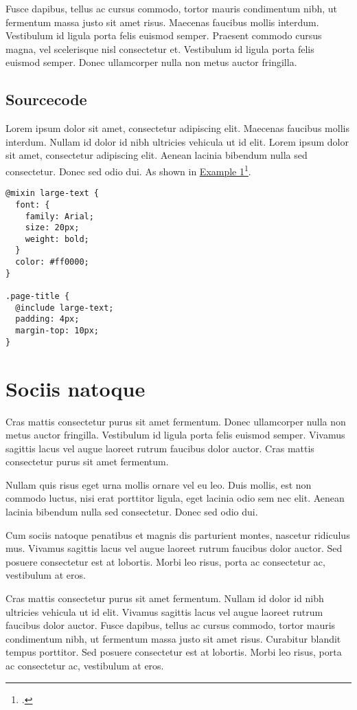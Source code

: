 \documentclass[a4paper]{article}
\begin{document}
\begin{multicols}{2}
Fusce dapibus, tellus ac cursus commodo, tortor mauris condimentum nibh, ut 
fermentum massa justo sit amet risus. Maecenas faucibus mollis interdum. 
Vestibulum id ligula porta felis euismod semper. Praesent commodo cursus magna, 
vel scelerisque nisl consectetur et. Vestibulum id ligula porta felis euismod 
semper. Donec ullamcorper nulla non metus auctor fringilla.

\subsection{Sourcecode}
Lorem ipsum dolor sit amet, consectetur adipiscing elit. Maecenas faucibus 
mollis interdum. Nullam id dolor id nibh ultricies vehicula ut id elit. Lorem 
ipsum dolor sit amet, consectetur adipiscing elit. Aenean lacinia bibendum nulla 
sed consectetur. Donec sed odio dui. As shown in 
\hyperref[mixin]{Example 1}\footcite[Taken from: ][]{sass:mixins}.

\begin{lstlisting}[caption={Example 1\label{mixin}}]
@mixin large-text {
  font: {
    family: Arial;
    size: 20px;
    weight: bold;
  }
  color: #ff0000;
}

.page-title {
  @include large-text;
  padding: 4px;
  margin-top: 10px;
}
\end{lstlisting}

\section{Sociis natoque}
Cras mattis consectetur purus sit amet fermentum. Donec ullamcorper nulla non 
metus auctor fringilla. Vestibulum id ligula porta felis euismod semper. Vivamus 
sagittis lacus vel augue laoreet rutrum faucibus dolor auctor. Cras mattis 
consectetur purus sit amet fermentum.

Nullam quis risus eget urna mollis ornare vel eu leo. Duis mollis, est non 
commodo luctus, nisi erat porttitor ligula, eget lacinia odio sem nec elit. 
Aenean lacinia bibendum nulla sed consectetur. Donec sed odio dui.

Cum sociis natoque penatibus et magnis dis parturient montes, nascetur ridiculus 
mus. Vivamus sagittis lacus vel augue laoreet rutrum faucibus dolor auctor. Sed 
posuere consectetur est at lobortis. Morbi leo risus, porta ac consectetur ac, 
vestibulum at eros.

Cras mattis consectetur purus sit amet fermentum. Nullam id dolor id nibh 
ultricies vehicula ut id elit. Vivamus sagittis lacus vel augue laoreet rutrum 
faucibus dolor auctor. Fusce dapibus, tellus ac cursus commodo, tortor mauris 
condimentum nibh, ut fermentum massa justo sit amet risus. Curabitur blandit 
tempus porttitor. Sed posuere consectetur est at lobortis. Morbi leo risus, 
porta ac consectetur ac, vestibulum at eros.

\end{multicols}

\printbibliography
\end{document}
